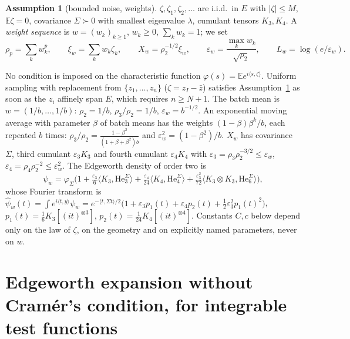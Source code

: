 \documentclass[10pt]{article}
\theoremstyle{definition}
\newtheorem{assumption}{Assumption}
\theoremstyle{remark}
\newcommand{\E}{\mathbb{E}}
\newcommand{\inner}[2]{\langle #1, #2\rangle}
\newcommand{\He}{\mathrm{He}}
\newcommand{\ew}{\varepsilon_w}
\newcommand{\Lw}{L_w}
\begin{document}
\begin{assumption}[bounded noise, weights]\label{ass:B}
$\zeta,\zeta_1,\zeta_2,\dots$ are i.i.d.\ in $E$ with $|\zeta|\le M$, $\E\zeta=0$, covariance $\Sigma\succ0$ with smallest
eigenvalue $\lambda$, cumulant tensors $K_3,K_4$. A \emph{weight sequence} is $w=(w_k)_{k\ge1}$, $w_k\ge0$,
$\sum_kw_k=1$; we set
\[
\rho_p=\sum_kw_k^p,\qquad \xi_w=\sum_kw_k\zeta_k,\qquad X_w=\rho_2^{-1/2}\xi_w,\qquad
\ew=\frac{\max_kw_k}{\sqrt{\rho_2}},\qquad \Lw=\log(e/\ew).
\]
\end{assumption}
No condition is imposed on the characteristic function $\varphi(s)=\E e^{i\inner s\zeta}$. Uniform sampling with
replacement from $\{z_1,\dots,z_n\}$ ($\zeta=z_I-\bar z$) satisfies Assumption~\ref{ass:B} as soon as the $z_i$ affinely
span $E$, which requires $n\ge N+1$. The batch mean is $w=(1/b,\dots,1/b)$: $\rho_2=1/b$, $\rho_3/\rho_2=1/b$,
$\ew=b^{-1/2}$. An exponential moving average with parameter $\beta$ of batch means has the weights
$(1-\beta)\beta^k/b$, each repeated $b$ times: $\rho_3/\rho_2=\frac{1-\beta^2}{(1+\beta+\beta^2)b}$ and
$\ew^2=(1-\beta^2)/b$. $X_w$ has covariance $\Sigma$, third cumulant $\varepsilon_3K_3$ and fourth cumulant
$\varepsilon_4K_4$ with $\varepsilon_3=\rho_3\rho_2^{-3/2}\le\ew$, $\varepsilon_4=\rho_4\rho_2^{-2}\le\ew^2$. The
Edgeworth density of order two is
\[
\psi_w=\varphi_\Sigma\Big(1+\tfrac{\varepsilon_3}{6}\inner{K_3}{\He_3^\Sigma}+\tfrac{\varepsilon_4}{24}\inner{K_4}{\He^\Sigma_4}
+\tfrac{\varepsilon_3^2}{72}\inner{K_3\otimes K_3}{\He_6^\Sigma}\Big),
\]
whose Fourier transform is $\widehat\psi_w(t)=\int e^{i\inner ty}\psi_w=e^{-\inner t{\Sigma t}/2}\big(1+\varepsilon_3p_1(t)+\varepsilon_4p_2(t)+\frac12\varepsilon_3^2p_1(t)^2\big)$,
$p_1(t)=\frac16K_3[(it)^{\otimes3}]$, $p_2(t)=\frac1{24}K_4[(it)^{\otimes4}]$. Constants $C,c$ below depend only on the
law of $\zeta$, on the geometry and on explicitly named parameters, never on $w$.

\section{Edgeworth expansion without Cram\'er's condition, for integrable test functions}\label{sec:fourier}
\end{document}
